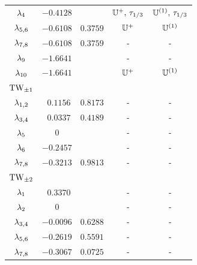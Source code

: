\begin{table}[t]
\begin{center}
\begin{tabular}{ccccc}
  $\eigExp[4]$   &$-0.4128$ &          & $\bbU^+,\,\Shift_{1/3}$  & $\bbU^{(1)},\,\Shift_{1/3}$\\
  $\eigExp[5,6]$ &$-0.6108$ & $0.3759$ & $\bbU^+$     & $\bbU^{(1)}$\\
  $\eigExp[7,8]$ &$-0.6108$ & $0.3759$ & -         & -\\
  $\eigExp[9]$   &$-1.6641$ &          & -         & -\\
  $\eigExp[10]$  &$-1.6641$ &          & $\bbU^+$     & $\bbU^{(1)}$ \\[2ex]
$\REQV{\pm}{1}$&  &  & \\\hline
  $\eigExp[1,2]$ & $\ \ 0.1156$ & $0.8173$ & -  & -\\
  $\eigExp[3,4]$ & $\ \ 0.0337$ & $0.4189$ & -  & -\\
  $\eigExp[5]$   & $0$      &          & -  & -\\
  $\eigExp[6]$   &$-0.2457$ &          & -  & -\\
  $\eigExp[7,8]$ &$-0.3213$ & $0.9813$ & -  & -\\[2ex]
$\REQV{\pm}{2}$&  &  & \\\hline
  $\eigExp[1]  $ & $\ \ 0.3370$ &          & -  & -\\
  $\eigExp[2]  $ & $0$      &          & -  & -\\
  $\eigExp[3,4]$ &$-0.0096$ & $0.6288$ & -  & -\\
  $\eigExp[5,6]$ &$-0.2619$ & $0.5591$ & -  & -\\
  $\eigExp[7,8]$ &$-0.3067$ & $0.0725$ & -  & -\\
\end{tabular}
\end{center}
\end{table}



